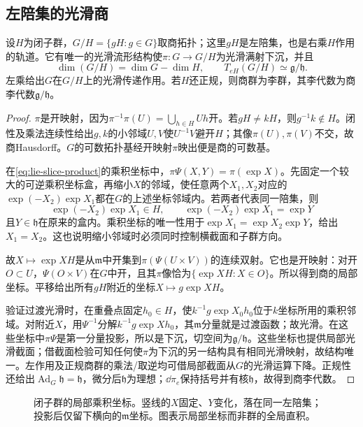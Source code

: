 \subsection{左陪集的光滑商}
\begin{theorem}\label{thm:lie-quotient}
设$H$为闭子群，$G/H=\{gH:g\in G\}$取商拓扑；这里$gH$是左陪集，也是右乘$H$作用的轨道。它有唯一的光滑流形结构使$\pi:G\to G/H$为光滑满射下沉，并且
\[
 \dim(G/H)=\dim G-\dim H,\qquad
 T_{eH}(G/H)\simeq\mathfrak g/\mathfrak h.
\]
左乘给出$G$在$G/H$上的光滑传递作用。若$H$还正规，则商群为李群，其李代数为商李代数$\mathfrak g/\mathfrak h$。
\end{theorem}
\begin{proof}
$\pi$是开映射，因为$\pi^{-1}\pi(U)=\bigcup_{h\in H}Uh$开。若$gH\ne kH$，则$g^{-1}k\notin H$。闭性及乘法连续性给出$g,k$的小邻域$U,V$使$U^{-1}V$避开$H$；其像$\pi(U),\pi(V)$不交，故商Hausdorff。$G$的可数拓扑基经开映射$\pi$映出便是商的可数基。

在\eqref{eq:lie-slice-product}的乘积坐标中，$\pi\Psi(X,Y)=\pi(\exp X)$。先固定一个较大的可逆乘积坐标盒，再缩小$X$的邻域，使任意两个$X_1,X_2$对应的$\exp(-X_2)\exp X_1$都在$G$的上述坐标邻域内。若两者代表同一陪集，则
\[
 \exp(-X_2)\exp X_1\in H,
 \qquad \exp(-X_2)\exp X_1=\exp Y
\]
且$Y\in\mathfrak h$在原来的盒内。乘积坐标的唯一性用于$\exp X_1=\exp X_2\exp Y$，给出$X_1=X_2$。这也说明缩小邻域时必须同时控制横截面和子群方向。

故$X\mapsto\exp XH$是从$\mathfrak m$中开集到$\pi(\Psi(U\times V))$的连续双射。它也是开映射：对开$O\subset U$，$\Psi(O\times V)$在$G$中开，且其$\pi$像恰为$\{\exp XH:X\in O\}$。所以得到商的局部坐标。平移给出所有$gH$附近的坐标$X\mapsto g\exp XH$。

验证过渡光滑时，在重叠点固定$h_0\in H$，使$k^{-1}g\exp X_0h_0$位于$k$坐标所用的乘积邻域。对附近$X$，用$\Psi^{-1}$分解$k^{-1}g\exp Xh_0$，其$\mathfrak m$分量就是过渡函数；故光滑。在这些坐标中$\pi\Psi$是第一分量投影，所以是下沉，切空间为$\mathfrak g/\mathfrak h$。这些坐标也提供局部光滑截面；借截面检验可知任何使$\pi$为下沉的另一结构具有相同光滑映射，故结构唯一。左作用及正规商群的乘法/取逆均可借局部截面从$G$的光滑运算下降。正规性还给出$\operatorname{Ad}_G\mathfrak h=\mathfrak h$，微分后$\mathfrak h$为理想；$\dd\pi_e$保持括号并有核$\mathfrak h$，故得到商李代数。
\end{proof}

\begin{figure}[htbp]
\centering
\caption{闭子群的局部乘积坐标。竖线的$X$固定、$Y$变化，落在同一左陪集；投影后仅留下横向的$\mathfrak m$坐标。图表示局部坐标而非群的全局直积。}
\label{fig:quotient-slice}
\end{figure}

